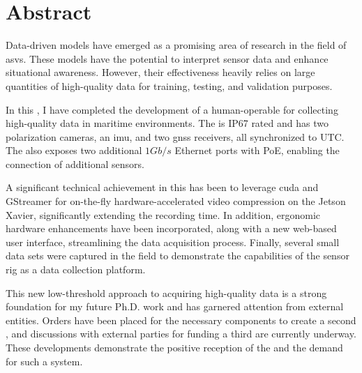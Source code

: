 \chapter*{Abstract}

Data-driven models have emerged as a promising area of research in the field of \glspl{asv}.
These models have the potential to interpret sensor data and enhance situational awareness.
However, their effectiveness heavily relies on large quantities of high-quality data for training, testing, and validation purposes.

In this \master, I have completed the development of a human-operable \sr for collecting high-quality data in maritime environments.
The \sr is IP67 rated and has two polarization cameras, an \gls{imu}, and two \gls{gnss} receivers, all synchronized to UTC.
The \sr also exposes two additional $1Gb/s$ Ethernet ports with PoE, enabling the connection of additional sensors.

A significant technical achievement in this \master has been to leverage \gls{cuda} and GStreamer for on-the-fly hardware-accelerated video compression on the Jetson Xavier, significantly extending the recording time.
In addition, ergonomic hardware enhancements have been incorporated, along with a new web-based user interface, streamlining the data acquisition process.
Finally, several small data sets were captured in the field to demonstrate the capabilities of the sensor rig as a data collection platform.

This new low-threshold approach to acquiring high-quality data is a strong foundation for my future Ph.D. work and has garnered attention from external entities.
Orders have been placed for the necessary components to create a second \sr, and discussions with external parties for funding a third \sr are currently underway.
These developments demonstrate the positive reception of the \sr and the demand for such a system.

